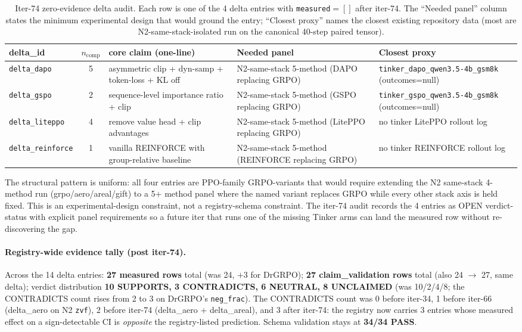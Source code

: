 \begin{table}[h]
\centering\small
\caption{Iter-74 zero-evidence delta audit. Each row is one of the
4 delta entries with \texttt{measured}$=[]$ after iter-74. The
``Needed panel'' column states the minimum experimental design that
would ground the entry; ``Closest proxy'' names the closest existing
repository data (most are N2-same-stack-isolated run on the canonical
40-step paired tensor).}
\label{tab:p6-zero-evidence-audit}
\begin{tabular}{l c l p{4.2cm} p{3.6cm}}
\toprule
delta\_id & $n_{\text{comp}}$ & core claim (one-line) & Needed panel & Closest proxy \\
\midrule
\texttt{delta\_dapo}      & 5 & asymmetric clip + dyn-samp + token-loss + KL off & N2-same-stack 5-method (DAPO replacing GRPO) & \texttt{tinker\_dapo\_qwen3.5-4b\_gsm8k} (outcomes=null) \\
\texttt{delta\_gspo}      & 2 & sequence-level importance ratio + clip         & N2-same-stack 5-method (GSPO replacing GRPO) & \texttt{tinker\_gspo\_qwen3.5-4b\_gsm8k} (outcomes=null) \\
\texttt{delta\_liteppo}   & 4 & remove value head + clip advantages           & N2-same-stack 5-method (LitePPO replacing GRPO) & no tinker LitePPO rollout log \\
\texttt{delta\_reinforce} & 1 & vanilla REINFORCE with group-relative baseline & N2-same-stack 5-method (REINFORCE replacing GRPO) & no tinker REINFORCE rollout log \\
\bottomrule
\end{tabular}
\end{table}

The structural pattern is uniform: all four entries are PPO-family
GRPO-variants that would require extending the N2 same-stack 4-method
run (grpo/aero/areal/gift) to a 5+ method panel where the named
variant replaces GRPO while every other stack axis is held fixed.
This is an experimental-design constraint, not a registry-schema
constraint. The iter-74 audit records the 4 entries as OPEN
verdict-status with explicit panel requirements so a future iter that
runs one of the missing Tinker arms can land the measured row
without re-discovering the gap.

\paragraph{Registry-wide evidence tally (post iter-74).}
Across the 14 delta entries: \textbf{27 measured rows} total (was
24, $+3$ for DrGRPO); \textbf{27 claim\_validation rows} total
(also 24 $\to$ 27, same delta); verdict distribution
\textbf{10 SUPPORTS, 3 CONTRADICTS, 6 NEUTRAL, 8 UNCLAIMED}
(was 10/2/4/8; the CONTRADICTS count rises from 2 to 3 on DrGRPO's
\texttt{neg\_frac}). The CONTRADICTS count was 0 before iter-34,
1 before iter-66 (delta\_aero on N2 \texttt{zvf}), 2 before iter-74
(delta\_aero + delta\_areal), and 3 after iter-74: the registry now
carries 3 entries whose measured effect on a sign-detectable CI is
\emph{opposite} the registry-listed prediction. Schema validation
stays at \textbf{34/34 PASS}.

